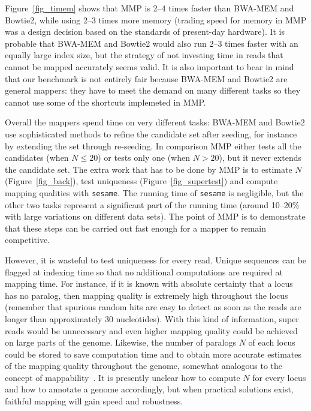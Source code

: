 \documentclass[english]{article}
\begin{document}
Figure~\ref{fig_timem} shows that MMP is 2--4 times faster than BWA-MEM
and Bowtie2, while using 2--3 times more memory (trading speed for memory
in MMP was a design decision based on the standards of present-day
hardware). It is probable that BWA-MEM and Bowtie2 would also run 2--3
times faster with an equally large index size, but the strategy of not
investing time in reads that cannot be mapped accurately seems valid. It
is also important to bear in mind that our benchmark is not entirely fair
because BWA-MEM and Bowtie2 are general mappers: they have to meet the
demand on many different tasks so they cannot use some of the shortcuts
implemeted in MMP.

Overall the mappers spend time on very different tasks: BWA-MEM and
Bowtie2 use sophisticated methods to refine the candidate set after
seeding, for instance by extending the set through re-seeding. In
comparison MMP either tests all the candidates (when $N \leq 20$) or tests
only one (when $N > 20$), but it never extends the candidate set. The
extra work that has to be done by MMP is to estimate $N$
(Figure~\ref{fig_back}), test uniqueness (Figure~\ref{fig_supertest}) and
compute mapping qualities with \texttt{sesame}. The running time of
\texttt{sesame} is negligible, but the other two tasks represent a
significant part of the running time (around 10--20\% with large
variations on different data sets). The point of MMP is to demonstrate
that these steps can be carried out fast enough for a mapper to remain
competitive.

However, it is wasteful to test uniqueness for every read. Unique
sequences can be flagged at indexing time so that no additional
computations are required at mapping time. For instance, if it is known
with absolute certainty that a locus has no paralog, then mapping quality
is extremely high throughout the locus (remember that spurious random hits
are easy to detect as soon as the reads are longer than approximately 30
nucleotides). With this kind of information, super reads would be
unnecessary and even higher mapping quality could be achieved on large
parts of the genome. Likewise, the number of paralogs $N$ of each locus
could be stored to save computation time and to obtain more accurate
estimates of the mapping quality throughout the genome, somewhat analogous
to the concept of mappability~\cite{pmid22276185}. It is presently unclear
how to compute $N$ for every locus and how to annotate a genome
accordingly, but when practical solutions exist, faithful mapping will
gain speed and robustness.
\end{document}
